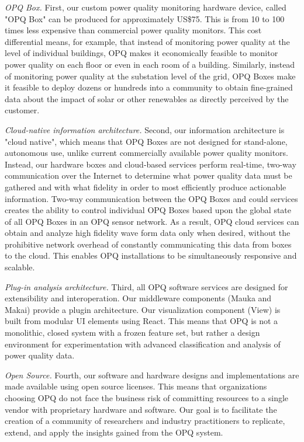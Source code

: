 {\em OPQ Box.} First, our custom power quality monitoring hardware device, called "OPQ Box" can be produced for approximately US\$75. This is from 10 to 100 times less expensive than commercial power quality monitors. This cost differential means, for example, that instead of monitoring power quality at the level of individual buildings, OPQ makes it economically feasible to monitor power quality on each floor or even in each room of a building. Similarly, instead of monitoring power quality at the substation level of the grid, OPQ Boxes make it feasible to deploy dozens or hundreds into a community to obtain fine-grained data about the impact of solar or other renewables as directly perceived by the customer.

{\em Cloud-native information architecture.} Second, our information architecture is "cloud native", which means that OPQ Boxes are not designed for stand-alone, autonomous use, unlike current commercially available power quality monitors. Instead, our hardware boxes and cloud-based services perform real-time, two-way communication over the Internet to determine what power quality data must be gathered and with what fidelity in order to most efficiently produce actionable information. Two-way communication between the OPQ Boxes and could services creates the ability to control individual OPQ Boxes based upon the global state of all OPQ Boxes in an OPQ sensor network. As a result, OPQ cloud services can obtain and analyze high fidelity wave form data only when desired, without the prohibitive network overhead of constantly communicating this data from boxes to the cloud. This enables OPQ installations to be simultaneously responsive and scalable.

{\em Plug-in analysis architecture.} Third, all OPQ software services are designed for extensibility and interoperation. Our middleware components (Mauka and Makai) provide a plugin architecture. Our visualization component (View) is built from modular UI elements using React.  This means that OPQ is not a monolithic, closed system with a frozen feature set, but rather a design environment for experimentation with advanced classification and analysis of power quality data.

{\em Open Source.} Fourth, our software and hardware designs and implementations are made available using open source licenses. This means that organizations choosing OPQ do not face the business risk of committing resources to a single vendor with proprietary hardware and software. Our goal is to facilitate the creation of a community of researchers and industry practitioners to replicate, extend, and apply the insights gained from the OPQ system.

